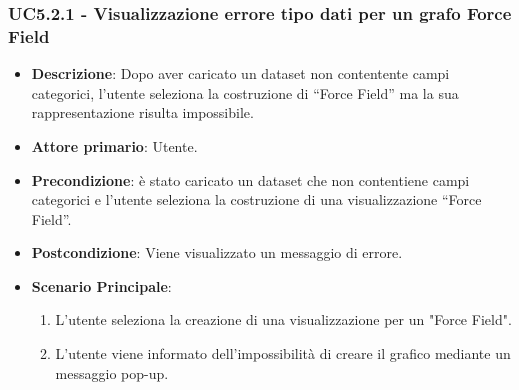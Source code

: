 \subsubsection{UC5.2.1 - Visualizzazione errore tipo dati per un grafo Force Field}
\label{subsec:uc5.1.2}
\begin{itemize}
    \item \textbf{Descrizione}: Dopo aver caricato un dataset non contentente campi categorici, 
                                l’utente seleziona la costruzione di “Force Field” ma 
                                la sua rappresentazione risulta impossibile.

    \item \textbf{Attore primario}: Utente.
    
    \item \textbf{Precondizione}:   è stato caricato un dataset che non contentiene campi categorici e l’utente 
                                    seleziona la costruzione di una visualizzazione “Force Field”.

    \item \textbf{Postcondizione}:  Viene visualizzato un messaggio di errore.
    
    \item \textbf{Scenario Principale}: 
    \begin{enumerate}
        \item L'utente seleziona la creazione di una visualizzazione per un "Force Field".
        \item L'utente viene informato dell'impossibilità di creare il grafico mediante un messaggio pop-up.
    \end{enumerate}
\end{itemize}



